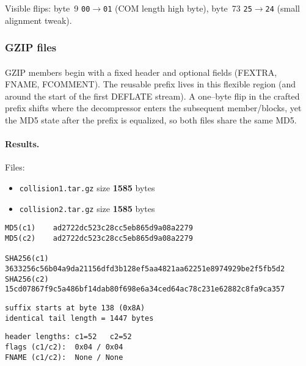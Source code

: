 \documentclass[runningheads]{llncs}
\begin{document}
    Visible flips: byte~9 \texttt{00$\rightarrow$01} (COM length high byte), byte~73 \texttt{25$\rightarrow$24} (small alignment tweak).

    \subsubsection{GZIP files}

    \paragraph{}
    GZIP members begin with a fixed header and optional fields (FEXTRA, FNAME, FCOMMENT). The reusable prefix lives in this flexible region (and around the start of the first DEFLATE stream). A one–byte flip in the crafted prefix shifts where the decompressor enters the subsequent member/blocks, yet the MD5 state after the prefix is equalized, so both files share the same MD5.

    \paragraph{Results.}
    Files:
    \begin{itemize}
        \item \texttt{collision1.tar.gz} size \textbf{1585} bytes
        \item \texttt{collision2.tar.gz} size \textbf{1585} bytes
    \end{itemize}

    \begin{lstlisting}[style=textblock, caption={Hashes for the reusable GZIP pair}, label={lst:gziphashes}]
MD5(c1)    ad2722dc523c28cc5eb865d9a08a2279
MD5(c2)    ad2722dc523c28cc5eb865d9a08a2279

SHA256(c1) 3633256c56b04a9da21156dfd3b128ef5aa4821aa62251e8974929be2f5fb5d2
SHA256(c2) 15cd07867f9c5a486bf14dab80f698e6a34ced64ac78c231e62882c8fa9ca357
    \end{lstlisting}

    \begin{lstlisting}[style=textblock, caption={Identical suffix boundary}, label={lst:gzip-suffix}]
suffix starts at byte 138 (0x8A)
identical tail length = 1447 bytes
    \end{lstlisting}

    \begin{lstlisting}[style=textblock, caption={GZIP headers (parsed)}, label={lst:gziphdr}]
header lengths: c1=52   c2=52
flags (c1/c2):  0x04 / 0x04
FNAME (c1/c2):  None / None
    \end{lstlisting}
\end{document}
